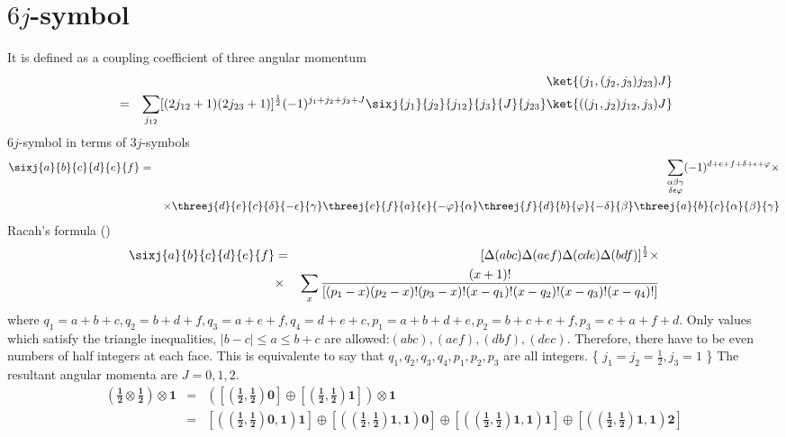 \documentclass{article}
\begin{document}
\section{$6j$-symbol}
\label{sec-5}
It is defined as a coupling coefficient of three angular momentum
\begin{eqnarray}
&  &\ket{(j_1,(j_2,j_3)j_{23})J}  \nonumber \\
 & = & \sum_{j_{12}} [(2j_{12}+1)(2j_{23}+1)]^{\frac{1}{2}}(-1)^{j_1+j_2+j_3+J}\sixj{j_1}{j_2}{j_{12}}{j_3}{J}{j_{23}} \ket{((j_1,j_2)j_{12},j_3)J}
\end{eqnarray}
$6j$-symbol in terms of $3j$-symbols
\begin{eqnarray}
\label{}
\sixj{a}{b}{c}{d}{e}{f} &=& \sum_{\substack{\alpha \beta \gamma \\ \delta \epsilon \varphi}} (-1)^{d+e+f+\delta + \epsilon + \varphi} \times \nonumber\\
& &\times \threej{d}{e}{c}{\delta}{-\epsilon}{\gamma} \threej{e}{f}{a}{\epsilon}{-\varphi}{\alpha} \threej{f}{d}{b}{\varphi}{-\delta}{\beta} \threej{a}{b}{c}{\alpha}{\beta}{\gamma}
\end{eqnarray}
Racah's formula (\cite{Racah})
\begin{eqnarray}
\sixj{a}{b}{c}{d}{e}{f} & = & [\Delta(abc)\Delta(aef)\Delta(cde)\Delta(bdf)]^{\frac{1}{2}} \times \nonumber \\
 & \times & \sum_{x}\frac{(x+1)!}{ [(p_1 -x)(p_2 -x)!(p_3 -x)!(x-q_1)!(x-q_2)!(x-q_3)!(x-q_4)!]} \nonumber\\
\end{eqnarray}
where $q_1 = a+b+c, q_2 = b + d + f, q_3 = a+e+f, q_4 = d+e+c, p_1 = a+b+d+e, p_2 = b+c+e+f, p_3 = c+a+f+d$.
Only values which satisfy the triangle inequalities, $|b-c|\le a \le b+c$ are allowed:$(abc),(aef),(dbf),(dec)$. Therefore, there have to be even numbers of half integers at each face. This is equivalente to say that $q_1, q_2, q_3 , q_4, p_1, p_2, p_3$ are all integers.
\exa\{ $j_1=j_2=\frac{1}{2}, j_3=1$ \}
The resultant angular momenta are $J = 0, 1,2$.
\begin{eqnarray}
\left(\mathbf{\frac{1}{2}} \otimes \mathbf{\frac{1}{2}} \right) \otimes \mathbf{1}  
    & = & \mathbf{ \left(\left[\left(\frac{1}{2},\frac{1}{2}\right) 0 \right] \oplus \left[\left(\frac{1}{2},\frac{1}{2}\right) 1 \right]\right) \otimes 1}\nonumber\\
    & = & \mathbf{  \left[\left(\left(\frac{1}{2},\frac{1}{2}\right) 0, 1 \right) 1 \right] \oplus \left[\left(\left(\frac{1}{2},\frac{1}{2}\right) 1, 1 \right) 0 \right] \oplus \left[\left(\left(\frac{1}{2}, \frac{1}{2}\right) 1, 1 \right) 1 \right] \oplus \left[\left(\left(\frac{1}{2}, \frac{1}{2}\right) 1, 1 \right) 2 \right]} \nonumber
\end{eqnarray}
\end{document}
